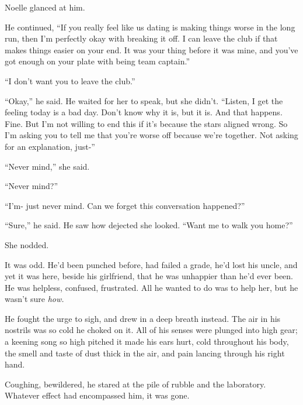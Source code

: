 Noelle glanced at him.



He continued, ``If you really feel like us dating is making things worse in the long run, then I'm perfectly okay with breaking it off.  I can leave the club if that makes things easier on your end.  It was your thing before it was mine, and you've got enough on your plate with being team captain.''



``I don't want you to leave the club.''



``Okay,'' he said.  He waited for her to speak, but she didn't.  ``Listen, I get the feeling today is a bad day.  Don't know why it is, but it is.  And that happens.  Fine.  But I'm not willing to end this if it's because the stars aligned wrong.  So I'm asking you to tell me that you're worse off because we're together.  Not asking for an explanation, just-''



``Never mind,'' she said.



``Never mind?''



``I'm- just never mind.  Can we forget this conversation happened?''



``Sure,'' he said.  He saw how dejected she looked.  ``Want me to walk you home?''



She nodded.



It was odd.  He'd been punched before, had failed a grade, he'd lost his uncle, and yet it was here, beside his girlfriend, that he was unhappier than he'd ever been.  He was helpless, confused, frustrated.  All he wanted to do was to help her, but he wasn't sure \emph{how.}



He fought the urge to sigh, and drew in a deep breath instead.  The air in his nostrils was so cold he choked on it.  All of his senses were plunged into high gear; a keening song so high pitched it made his ears hurt, cold throughout his body, the smell and taste of dust thick in the air, and pain lancing through his right hand.



Coughing, bewildered, he stared at the pile of rubble and the laboratory.  Whatever effect had encompassed him, it was gone.



